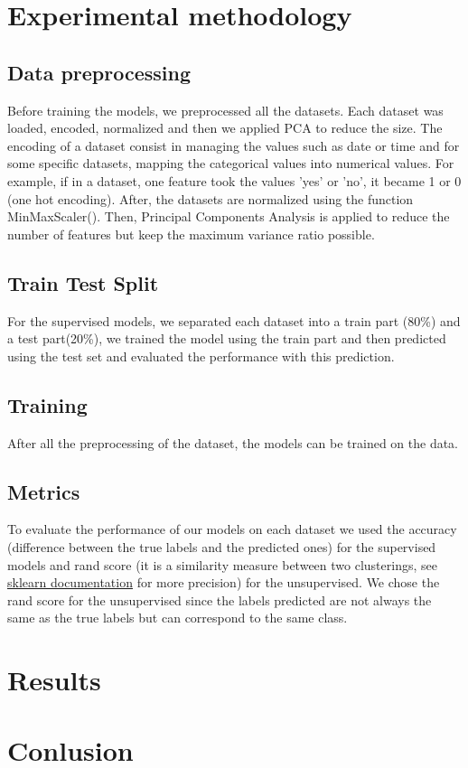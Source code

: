 \documentclass[10pt, a4paper]{article}
\begin{document}
\section{Experimental methodology}
\subsection{Data preprocessing}
Before training the models, we preprocessed all the datasets. Each dataset was loaded, encoded, normalized and then we applied PCA to reduce the size. The encoding of a dataset consist in managing the values such as date or time and for some specific datasets, mapping the categorical values into numerical values. For example, if in a dataset, one feature took the values 'yes' or 'no', it became 1 or 0 (one hot encoding).
After, the datasets are normalized using the function MinMaxScaler().
Then, Principal Components Analysis is applied to reduce the number of features but keep the maximum variance ratio possible.

\subsection{Train Test Split}
For the supervised models, we separated each dataset into a train part (80\%) and a test part(20\%), we trained the model using the train part and then predicted using the test set and evaluated the performance with this prediction.

\subsection{Training}
After all the preprocessing of the dataset, the models can be trained on the data.

\subsection{Metrics}
To evaluate the performance of our models on each dataset we used the accuracy (difference between the true labels and the predicted ones) for the supervised models and rand score (it is a similarity measure between two clusterings, see \href{https://scikit-learn.org/stable/modules/generated/sklearn.metrics.rand_score.html#sklearn.metrics.rand_score}{sklearn documentation} for more precision) for the unsupervised. We chose the rand score for the unsupervised since the labels predicted are not always the same as the true labels but can correspond to the same class.
\newpage

\section{Results}

\newpage

\section{Conlusion}
%
\end{document}
